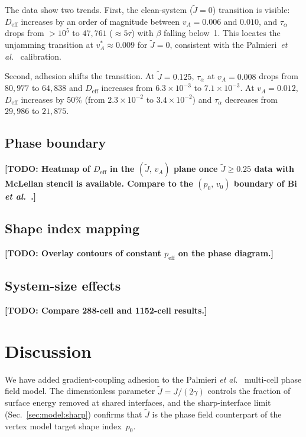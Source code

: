 \documentclass[aps,pre,twocolumn,superscriptaddress,longbibliography,floatfix]{revtex4-2}
\newcommand{\vA}{v_{\!A}}                  %
\newcommand{\peff}{p_{\mathrm{eff}}}       %
\newcommand{\Jt}{\tilde{J}}               %
\newcommand{\TODO}[1]{{\color{red}\textbf{[TODO: #1]}}}
\begin{document}
The data show two trends. First, the clean-system ($\Jt = 0$)
transition is visible: $D_{\mathrm{eff}}$ increases by an order of
magnitude between $\vA = 0.006$ and $0.010$, and $\tau_\alpha$ drops
from $>10^5$ to $47{,}761$ ($\approx 5\tau$) with $\beta$ falling
below~1.
This locates the unjamming transition at $v_A^* \approx 0.009$ for
$\Jt = 0$, consistent with the Palmieri~\textit{et al.}~\cite{Palmieri2015}
calibration.

Second, adhesion shifts the transition.  At $\Jt = 0.125$,
$\tau_\alpha$ at $\vA = 0.008$ drops from $80{,}977$ to $64{,}838$
and $D_{\mathrm{eff}}$ increases from $6.3 \times 10^{-3}$ to
$7.1 \times 10^{-3}$.  At $\vA = 0.012$, $D_{\mathrm{eff}}$
increases by 50\% (from $2.3 \times 10^{-2}$ to
$3.4 \times 10^{-2}$) and $\tau_\alpha$ decreases from
$29{,}986$ to $21{,}875$.

\subsection{Phase boundary}
\label{sec:diagram:boundary}

\TODO{Heatmap of $D_{\mathrm{eff}}$ in the $(\Jt,\,\vA)$ plane
once $\Jt \geq 0.25$ data with McLellan stencil is available.
Compare to the $(p_0,\,v_0)$ boundary of Bi \textit{et al.}~\cite{Bi2016}.}

\subsection{Shape index mapping}
\label{sec:diagram:shape}

\TODO{Overlay contours of constant $\peff$ on the phase diagram.}

\subsection{System-size effects}
\label{sec:diagram:size}

\TODO{Compare 288-cell and 1152-cell results.}


\section{Discussion}
\label{sec:discussion}

We have added gradient-coupling adhesion to the Palmieri
\textit{et al.}~\cite{Palmieri2015} multi-cell phase field model.
The dimensionless parameter $\Jt = J/(2\gamma)$ controls the
fraction of surface energy removed at shared interfaces, and the
sharp-interface limit (Sec.~\ref{sec:model:sharp}) confirms that
$\Jt$ is the phase field counterpart of the vertex model target
shape index~$p_0$.
\end{document}
